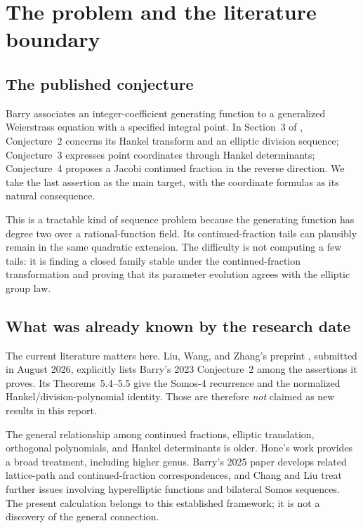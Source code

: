 \documentclass[11pt,letterpaper]{article}
\numberwithin{equation}{section}
\theoremstyle{definition}
\theoremstyle{remark}
\begin{document}
\section{The problem and the literature boundary}\label{sec:status}

\subsection{The published conjecture}
Barry associates an integer-coefficient generating function to a generalized
Weierstrass equation with a specified integral point. In Section~3 of
\cite{Barry2023}, Conjecture~2 concerns its Hankel transform and an elliptic
division sequence; Conjecture~3 expresses point coordinates through Hankel
determinants; Conjecture~4 proposes a Jacobi continued fraction in the reverse
direction. We take the last assertion as the main target, with the coordinate
formulas as its natural consequence.

This is a tractable kind of sequence problem because the generating function
has degree two over a rational-function field. Its continued-fraction tails
can plausibly remain in the same quadratic extension. The difficulty is not
computing a few tails: it is finding a closed family stable under the
continued-fraction transformation and proving that its parameter evolution
agrees with the elliptic group law.

\subsection{What was already known by the research date}
The current literature matters here. Liu, Wang, and Zhang's preprint
\cite{LWZ2026}, submitted in August 2026, explicitly lists Barry's 2023
Conjecture~2 among the assertions it proves. Its Theorems~5.4--5.5 give the
Somos-4 recurrence and the normalized Hankel/division-polynomial identity.
Those are therefore \emph{not} claimed as new results in this report.

The general relationship among continued fractions, elliptic translation,
orthogonal polynomials, and Hankel determinants is older. Hone's work
\cite{Hone2021} provides a broad treatment, including higher genus.
Barry's 2025 paper \cite{Barry2025} develops related lattice-path and
continued-fraction correspondences, and Chang and Liu \cite{CL2026}
treat further issues involving hyperelliptic functions and bilateral Somos
sequences. The present calculation belongs to this established framework;
it is not a discovery of the general connection.
\end{document}
